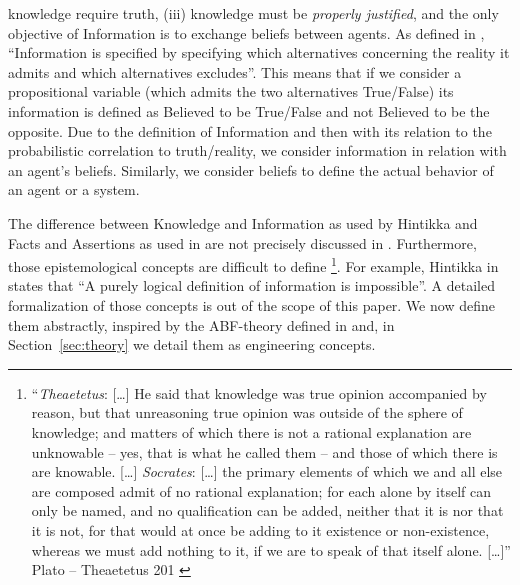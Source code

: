 \documentclass[conference]{IEEEtran}
\begin{document}
knowledge require truth, (iii) knowledge must be \emph{properly justified}, and
the only objective of Information is to exchange beliefs between agents.  As
defined in \autocite{Hintikka1993Information}, ``Information is specified by
specifying which alternatives concerning the reality it admits and which
alternatives excludes''. This means that if we consider a propositional
variable (which admits the two alternatives True/False) its information is
defined as Believed to be True/False and not Believed to be the opposite.  Due
to the definition of Information and then with its relation to the
probabilistic correlation to truth/reality, we consider information in relation
with an agent's beliefs. Similarly, we consider beliefs to define the actual
behavior of an agent or a system.

The difference between Knowledge and Information as used by Hintikka and Facts
and Assertions as used in \autocite{Santaca2016abf} are not precisely discussed
in \autocite{Santaca2016abf}.  Furthermore, those epistemological concepts are
difficult to define
\autocite{Gettier2012knowledge}\footnote{``\emph{Theaetetus}: [\ldots] He said
that knowledge was true opinion accompanied by reason, but that unreasoning
true opinion was outside of the sphere of knowledge; and matters of which there
is not a rational explanation are unknowable -- yes, that is what he called
them -- and those of which there is are knowable. [\ldots] \emph{Socrates}:
[\ldots] the primary elements of which we and all else are composed admit of no
rational explanation; for each alone by itself can only be named, and no
qualification can be added, neither that it is nor that it is not, for that
would at once be adding to it existence or non-existence, whereas we must add
nothing to it, if we are to speak of that itself alone.  [\ldots]'' Plato --
Theaetetus 201 \autocite{Plato1914Plato}}.  For example, Hintikka in
\autocite{Hintikka1993Information} states that ``A purely logical definition of
information is impossible''. A detailed formalization of those concepts is out
of the scope of this paper. We now define them abstractly, inspired by the
ABF-theory  defined in \autocite{Santaca2016abf} and, in
Section~\ref{sec:theory} we detail them as engineering concepts.
\end{document}
